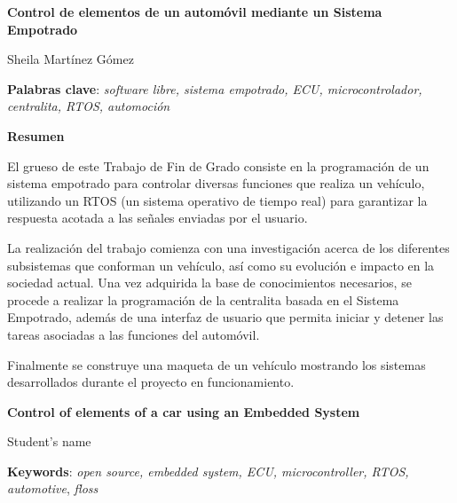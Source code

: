 \thispagestyle{empty}

\begin{center}
{\large\bfseries Control de elementos de un automóvil \newline mediante un Sistema Empotrado }\newline
\end{center}
\begin{center}
Sheila Martínez Gómez\newline
\end{center}


\vspace{0.5cm}
\noindent\textbf{Palabras clave}: \textit{software libre, sistema empotrado, ECU, microcontrolador, centralita, RTOS, automoción}
\vspace{0.7cm}

\noindent\textbf{Resumen}\newline

El grueso de este Trabajo de Fin de Grado consiste en la programación de un sistema empotrado para controlar diversas funciones que realiza un vehículo, utilizando un RTOS (un sistema operativo de tiempo real) para garantizar la respuesta acotada a las señales enviadas por el usuario.\newline

La realización del trabajo comienza con una investigación acerca de los diferentes subsistemas que conforman un vehículo, así como su evolución e impacto en la sociedad actual. Una vez adquirida la base de conocimientos necesarios, se procede a realizar la programación de la centralita basada en el Sistema Empotrado, además de una interfaz de usuario que permita iniciar y detener las tareas asociadas a las funciones del automóvil.\newline

Finalmente se construye una maqueta de un vehículo mostrando los sistemas desarrollados durante el proyecto en funcionamiento.\newline

\cleardoublepage

\begin{center}
	{\large\bfseries Control of elements of a car \newline using an Embedded System}\\
\end{center}
\begin{center}
	Student's name\\
\end{center}
\vspace{0.5cm}
\noindent\textbf{Keywords}: \textit{open source, embedded system, ECU, microcontroller, RTOS, automotive}, \textit{floss}
\vspace{0.7cm}

